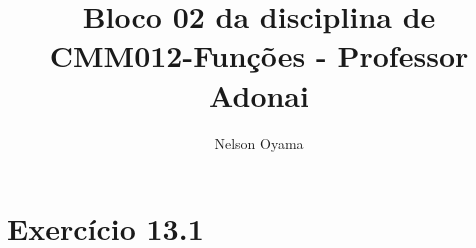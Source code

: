 \documentclass[a4paper]{article}
\author{Nelson Oyama}
\title{Bloco 02 da disciplina de CMM012-Funções - Professor Adonai}
\date{}
\begin{document}
	\maketitle

	\section{Exercício 13.1}
	
	
\end{document}
